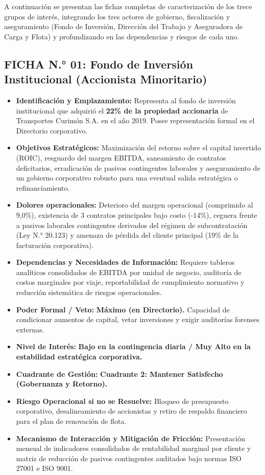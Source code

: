A continuación se presentan las fichas completas de caracterización de los trece grupos de interés, integrando los tres actores de gobierno, fiscalización y aseguramiento (Fondo de Inversión, Dirección del Trabajo y Aseguradora de Carga y Flota) y profundizando en las dependencias y riesgos de cada uno.

\subsection*{FICHA N.° 01: Fondo de Inversión Institucional (Accionista Minoritario)}
\begin{itemize}
\item \textbf{Identificación y Emplazamiento:} Representa al fondo de inversión institucional que adquirió el \textbf{22\% de la propiedad accionaria} de Transportes Curimón S.A. en el año 2019. Posee representación formal en el Directorio corporativo.
\item \textbf{Objetivos Estratégicos:} Maximización del retorno sobre el capital invertido (ROIC), resguardo del margen EBITDA, saneamiento de contratos deficitarios, erradicación de pasivos contingentes laborales y aseguramiento de un gobierno corporativo robusto para una eventual salida estratégica o refinanciamiento.
\item \textbf{Dolores operacionales:} Deterioro del margen operacional (comprimido al 9,0\%), existencia de 3 contratos principales bajo costo (-14\%), ceguera frente a pasivos laborales contingentes derivados del régimen de subcontratación (Ley N.° 20.123) y amenaza de pérdida del cliente principal (19\% de la facturación corporativa).
\item \textbf{Dependencias y Necesidades de Información:} Requiere tableros analíticos consolidados de EBITDA por unidad de negocio, auditoría de costos marginales por viaje, reportabilidad de cumplimiento normativo y reducción sistemática de riesgos operacionales.
\item \textbf{Poder Formal / Veto:} \textbf{Máximo (en Directorio).} Capacidad de condicionar aumentos de capital, vetar inversiones y exigir auditorías forenses externas.
\item \textbf{Nivel de Interés:} \textbf{Bajo en la contingencia diaria / Muy Alto en la estabilidad estratégica corporativa.}
\item \textbf{Cuadrante de Gestión:} \textbf{Cuadrante 2: Mantener Satisfecho (Gobernanza y Retorno).}
\item \textbf{Riesgo Operacional si no se Resuelve:} Bloqueo de presupuesto corporativo, desalineamiento de accionistas y retiro de respaldo financiero para el plan de renovación de flota.
\item \textbf{Mecanismo de Interacción y Mitigación de Fricción:} Presentación mensual de indicadores consolidados de rentabilidad marginal por cliente y matriz de reducción de pasivos contingentes auditados bajo normas ISO 27001 e ISO 9001.
\end{itemize}
